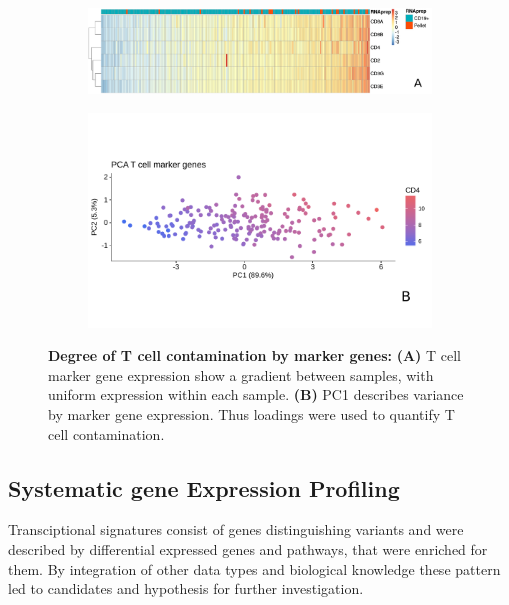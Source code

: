 \begin{figure}
	\centering
	\begin{subfigure}[t]{\columnwidth}
		\includegraphics[width=\columnwidth]{./Figures/TmarkExpression.pdf}
		\subcaption*{}
		\label{fig:TmarkExpression}
	\end{subfigure}
	\hfill
	\begin{subfigure}[t]{\columnwidth}
		\includegraphics[width=\columnwidth]{./Figures/Tmark_pca.pdf}
		\subcaption*{}
		\label{fig:TmarkPCA}
	\end{subfigure}
	\caption{\textbf{Degree of T cell contamination by marker genes:} \textbf{(A)} T cell marker gene expression show a gradient between samples, with uniform expression within each sample. \textbf{(B)} PC1 describes variance by marker gene expression. Thus loadings were used to quantify T cell contamination.}
	\label{fig:TCell}
\end{figure}

\FloatBarrier



\subsection{Systematic gene Expression Profiling}
Transciptional signatures consist of genes distinguishing variants and were described by differential expressed genes and pathways, that were enriched for them. By integration of other data types and biological knowledge these pattern led to candidates and hypothesis for further investigation.  


